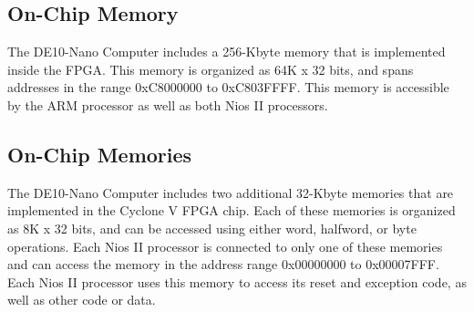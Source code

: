 \documentclass[11pt, twoside, pdftex]{article}
\newcommand{\commonFiles}{../../../common/doc}
\begin{document}



\subsection{On-Chip Memory}

The DE10-Nano Computer includes a 256-Kbyte memory that is implemented inside the FPGA.  This 
memory is organized as 64K {\sf x} 32 bits, and spans addresses in the range 
{\sf 0xC8000000} to {\sf 0xC803FFFF}. This memory is accessible by the ARM processor as
well as both Nios II processors.

\subsection{On-Chip Memories}
The DE10-Nano Computer includes two additional 32-Kbyte memories that are implemented in the
Cyclone V FPGA chip.  Each of these memories is organized as 8K {\sf x} 32 bits, and 
can be accessed using either word, halfword, or byte operations. Each Nios II processor is
connected to only one of these memories and can access the memory in the address range
{\sf 0x00000000} to {\sf 0x00007FFF}. Each Nios II processor uses this memory to access its
reset and exception code, as well as other code or data.














\end{document}
